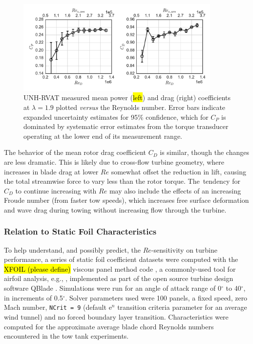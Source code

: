 \documentclass[energies,article,accept,moreauthors,pdftex,10pt,a4paper]{mdpi}
\theoremstyle{mdpi}
\newcounter{ex}
\newcounter{re}
\begin{document}
\begin{figure}[H]
\centering

\includegraphics[width=0.9\textwidth]{figures/perf_re_dep}

\caption{UNH-RVAT measured mean power (\hl {left}) and drag (right) coefficients at
 $\lambda=1.9$ plotted \textit{versus} the Reynolds number. Error bars indicate expanded
 uncertainty estimates for 95\% confidence, which for $C_P$ is dominated by
 systematic error estimates from the torque transducer operating at the lower end
 of its measurement range.}
 

\label{fig:perf-Re-dep}
\end{figure}

The behavior of the mean rotor drag coefficient $C_D$ is similar, though the
changes are less dramatic. This is likely due to cross-flow turbine geometry,
where increases in blade drag at lower $Re$ somewhat offset the reduction in
lift, causing the total streamwise force to vary less than the rotor torque. The~tendency for $C_D$ to continue increasing with $Re$ may also include the effects
of an increasing Froude number (from faster tow speeds), which increases free
surface deformation and wave drag during towing without increasing flow through
the turbine.

\subsubsection{Relation to Static Foil Characteristics}

To help understand, and possibly predict, the $Re$-sensitivity on turbine
performance, a series of static foil coefficient datasets were computed with the
\hl {XFOIL (please define)} viscous panel method code \cite{Drela1989}, a commonly-used tool for
airfoil analysis, e.g., \cite{Castelli2011, Walker2014}, implemented as part of
the open source turbine design software QBlade \cite{Marten2013}. Simulations
were run for an angle of attack range of 0$^{\circ}$
 to 40$^{\circ}$, in increments of 0.5$^{\circ}$. Solver parameters used were 100 panels, a fixed speed, zero Mach
number, \texttt{NCrit = 9} %
 (default $\mathrm{e}^n$ transition criteria parameter
for an average wind tunnel) and no forced boundary layer transition.
Characteristics were computed for the approximate average blade chord Reynolds
numbers encountered in the tow tank experiments.
\end{document}

